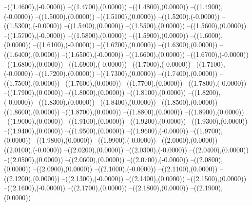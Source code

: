 {	--({\sx*(1.4600)},{\sy*(-0.0000)})
	--({\sx*(1.4700)},{\sy*(0.0000)})
	--({\sx*(1.4800)},{\sy*(0.0000)})
	--({\sx*(1.4900)},{\sy*(-0.0000)})
	--({\sx*(1.5000)},{\sy*(0.0000)})
	--({\sx*(1.5100)},{\sy*(0.0000)})
	--({\sx*(1.5200)},{\sy*(-0.0000)})
	--({\sx*(1.5300)},{\sy*(-0.0000)})
	--({\sx*(1.5400)},{\sy*(0.0000)})
	--({\sx*(1.5500)},{\sy*(0.0000)})
	--({\sx*(1.5600)},{\sy*(0.0000)})
	--({\sx*(1.5700)},{\sy*(-0.0000)})
	--({\sx*(1.5800)},{\sy*(0.0000)})
	--({\sx*(1.5900)},{\sy*(0.0000)})
	--({\sx*(1.6000)},{\sy*(0.0000)})
	--({\sx*(1.6100)},{\sy*(-0.0000)})
	--({\sx*(1.6200)},{\sy*(0.0000)})
	--({\sx*(1.6300)},{\sy*(0.0000)})
	--({\sx*(1.6400)},{\sy*(0.0000)})
	--({\sx*(1.6500)},{\sy*(-0.0000)})
	--({\sx*(1.6600)},{\sy*(0.0000)})
	--({\sx*(1.6700)},{\sy*(-0.0000)})
	--({\sx*(1.6800)},{\sy*(0.0000)})
	--({\sx*(1.6900)},{\sy*(-0.0000)})
	--({\sx*(1.7000)},{\sy*(-0.0000)})
	--({\sx*(1.7100)},{\sy*(-0.0000)})
	--({\sx*(1.7200)},{\sy*(0.0000)})
	--({\sx*(1.7300)},{\sy*(0.0000)})
	--({\sx*(1.7400)},{\sy*(0.0000)})
	--({\sx*(1.7500)},{\sy*(0.0000)})
	--({\sx*(1.7600)},{\sy*(0.0000)})
	--({\sx*(1.7700)},{\sy*(0.0000)})
	--({\sx*(1.7800)},{\sy*(-0.0000)})
	--({\sx*(1.7900)},{\sy*(0.0000)})
	--({\sx*(1.8000)},{\sy*(0.0000)})
	--({\sx*(1.8100)},{\sy*(0.0000)})
	--({\sx*(1.8200)},{\sy*(-0.0000)})
	--({\sx*(1.8300)},{\sy*(0.0000)})
	--({\sx*(1.8400)},{\sy*(0.0000)})
	--({\sx*(1.8500)},{\sy*(0.0000)})
	--({\sx*(1.8600)},{\sy*(0.0000)})
	--({\sx*(1.8700)},{\sy*(0.0000)})
	--({\sx*(1.8800)},{\sy*(0.0000)})
	--({\sx*(1.8900)},{\sy*(0.0000)})
	--({\sx*(1.9000)},{\sy*(0.0000)})
	--({\sx*(1.9100)},{\sy*(0.0000)})
	--({\sx*(1.9200)},{\sy*(0.0000)})
	--({\sx*(1.9300)},{\sy*(0.0000)})
	--({\sx*(1.9400)},{\sy*(0.0000)})
	--({\sx*(1.9500)},{\sy*(0.0000)})
	--({\sx*(1.9600)},{\sy*(-0.0000)})
	--({\sx*(1.9700)},{\sy*(0.0000)})
	--({\sx*(1.9800)},{\sy*(0.0000)})
	--({\sx*(1.9900)},{\sy*(-0.0000)})
	--({\sx*(2.0000)},{\sy*(0.0000)})
	--({\sx*(2.0100)},{\sy*(-0.0000)})
	--({\sx*(2.0200)},{\sy*(0.0000)})
	--({\sx*(2.0300)},{\sy*(-0.0000)})
	--({\sx*(2.0400)},{\sy*(0.0000)})
	--({\sx*(2.0500)},{\sy*(0.0000)})
	--({\sx*(2.0600)},{\sy*(0.0000)})
	--({\sx*(2.0700)},{\sy*(-0.0000)})
	--({\sx*(2.0800)},{\sy*(0.0000)})
	--({\sx*(2.0900)},{\sy*(0.0000)})
	--({\sx*(2.1000)},{\sy*(-0.0000)})
	--({\sx*(2.1100)},{\sy*(0.0000)})
	--({\sx*(2.1200)},{\sy*(0.0000)})
	--({\sx*(2.1300)},{\sy*(-0.0000)})
	--({\sx*(2.1400)},{\sy*(0.0000)})
	--({\sx*(2.1500)},{\sy*(0.0000)})
	--({\sx*(2.1600)},{\sy*(-0.0000)})
	--({\sx*(2.1700)},{\sy*(0.0000)})
	--({\sx*(2.1800)},{\sy*(0.0000)})
	--({\sx*(2.1900)},{\sy*(0.0000)})
}
